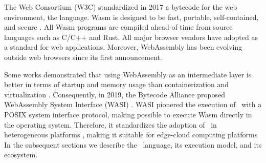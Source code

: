 
\msection{\Wasm}

The Web Consortium (W3C) standardized in 2017 a bytecode for the web environment, the \Wasm language. 
Wasm is designed to be fast, portable, self-contained, and secure \cite{Haas_2017}.
All Wasm programs are compiled ahead-of-time from source languages such as C/C++ and Rust.
All major browser vendors have adopted \Wasm as a standard for web applications.
Moreover, WebAssembly has been evolving outside web browsers since its first announcement.


Some works demonstrated that using WebAssembly as an intermediate layer is better in terms of startup and memory usage than containerization and virtualization \cite{pMendkiServerless, 1244493Jacobsson}. 
Consequently, in 2019, the Bytecode Alliance \cite{bytecodealliance} proposed WebAssembly System Interface (WASI) \cite{WASI}. 
WASI pionered the execution of \wasm\ with a POSIX system interface protocol, making possible to execute Wasm directly in the operating system. 
Therefore, it standardizes the adoption of \wasm\ in heterogeneous platforms \cite{bryant2020webassembly}, making it suitable for edge-cloud computing platforms \cite{9640153, wen2020wasmachine}
In the subsequent sections we describe the \wasm\ language, its execution model, and its ecosystem.

\label{background:wasm:binary}

